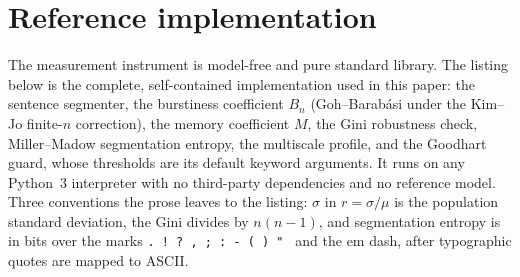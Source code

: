 \documentclass{article}
\begin{document}
\section{Reference implementation}
\label{sec:refimpl}

The measurement instrument is model-free and pure standard library. The listing below is the
complete, self-contained implementation used in this paper: the sentence segmenter, the
burstiness coefficient $B_n$ (Goh--Barab\'asi under the Kim--Jo finite-$n$ correction), the
memory coefficient $M$, the Gini robustness check, Miller--Madow segmentation entropy, the
multiscale profile, and the Goodhart guard, whose thresholds are its default keyword arguments.
It runs on any Python~3 interpreter with no third-party dependencies and no reference model.
Three conventions the prose leaves to the listing: $\sigma$ in $r=\sigma/\mu$ is the population
standard deviation, the Gini divides by $n(n-1)$, and segmentation entropy is in bits over the
marks \texttt{. ! ? , ; : - ( ) " \textquotesingle} and the em dash, after typographic quotes are mapped to ASCII.
\end{document}
